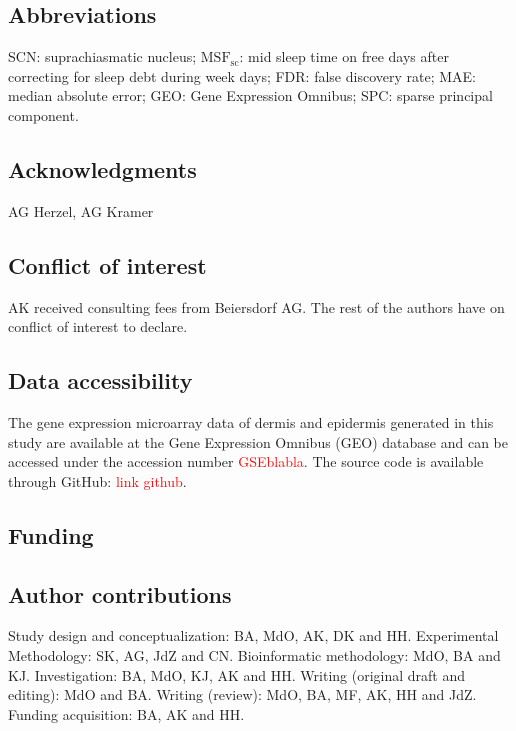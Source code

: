 \subsection*{Abbreviations}
SCN: suprachiasmatic nucleus; $\textrm{MSF}_\textrm{sc}$: mid sleep time on free days after correcting for sleep debt during week days; FDR: false discovery rate; MAE: median absolute error; GEO: Gene Expression Omnibus; SPC: sparse principal component.

\subsection*{Acknowledgments}
AG Herzel, AG Kramer 

\subsection*{Conflict of interest}
AK received consulting fees from Beiersdorf AG. The rest of the authors have on conflict of interest to declare.


\subsection*{Data accessibility}
The gene expression microarray data of dermis and epidermis generated in this study are available at the Gene Expression Omnibus (GEO) database and can be accessed under the accession number \textcolor{red}{GSEblabla}. The source code is available through GitHub: \textcolor{red}{link github}. 

\subsection*{Funding}

\subsection*{Author contributions}
Study design and conceptualization: BA, MdO, AK, DK and HH. Experimental Methodology: SK, AG, JdZ and CN. Bioinformatic methodology: MdO, BA and KJ. Investigation: BA, MdO, KJ, AK and HH. Writing (original draft and editing): MdO and BA. Writing (review): MdO, BA, MF, AK, HH and JdZ. Funding acquisition: BA, AK and HH. 

